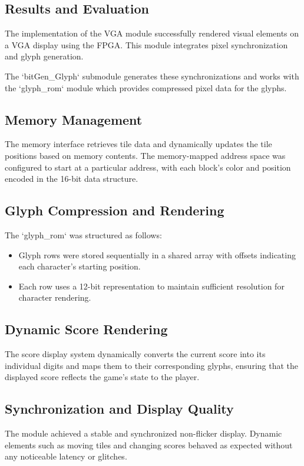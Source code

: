 \documentclass{subfile}
\begin{document}
  \subsection{Results and Evaluation}

  The implementation of the VGA module successfully rendered visual elements on a VGA display using the FPGA. This module integrates pixel synchronization and glyph generation.

  The `bitGen\_Glyph` submodule generates these synchronizations and works with the `glyph\_rom` module which provides compressed pixel data for the glyphs.

  \subsection{Memory Management}
  The memory interface retrieves tile data and dynamically updates the tile positions based on memory contents. The memory-mapped address space was configured to start at a particular address, with each block's color and position encoded in the 16-bit data structure. 

  \subsection{Glyph Compression and Rendering}
  The `glyph\_rom` was structured as follows:
  \begin{itemize}
      \item Glyph rows were stored sequentially in a shared array with offsets indicating each character's starting position.
      \item Each row uses a 12-bit representation to maintain sufficient resolution for character rendering.
  \end{itemize}

  \subsection{Dynamic Score Rendering}
  The score display system dynamically converts the current score into its individual digits and maps them to their corresponding glyphs, ensuring that the displayed score reflects the game's state to the player. 

  \subsection{Synchronization and Display Quality}
  The module achieved a stable and synchronized non-flicker display. Dynamic elements such as moving tiles and changing scores behaved as expected without any noticeable latency or glitches.
\end{document}
